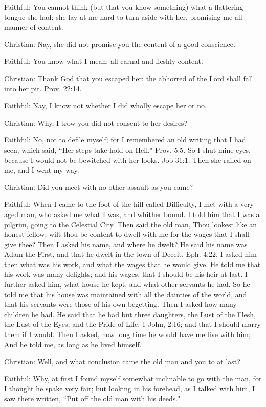 Faithful: You cannot think (but that you know something) what a flattering tongue she had; she lay at me hard to turn aside with her, promising me all manner of content.

Christian: Nay, she did not promise you the content of a good conscience.

Faithful: You know what I mean; all carnal and fleshly content.

Christian: Thank God that you escaped her: the abhorred of the Lord shall fall into her pit. Prov. 22:14.

Faithful: Nay, I know not whether I did wholly escape her or no.

Christian: Why, I trow you did not consent to her desires?

Faithful: No, not to defile myself; for I remembered an old writing that I had seen, which said, ``Her steps take hold on Hell." Prov. 5:5. So I shut mine eyes, because I would not be bewitched with her looks. Job 31:1. Then she railed on me, and I went my way.

Christian: Did you meet with no other assault as you came?

Faithful: When I came to the foot of the hill called Difficulty, I met with a very aged man, who asked me what I was, and whither bound. I told him that I was a pilgrim, going to the Celestial City. Then said the old man, Thou lookest like an honest fellow; wilt thou be content to dwell with me for the wages that I shall give thee? Then I asked his name, and where he dwelt? He said his name was Adam the First, and that he dwelt in the town of Deceit. Eph. 4:22. I asked him then what was his work, and what the wages that he would give. He told me that his work was many delights; and his wages, that I should be his heir at last. I further asked him, what house he kept, and what other servants he had. So he told me that his house was maintained with all the dainties of the world, and that his servants were those of his own begetting. Then I asked how many children he had. He said that he had but three daughters, the Lust of the Flesh, the Lust of the Eyes, and the Pride of Life, 1 John, 2:16; and that I should marry them if I would. Then I asked, how long time he would have me live with him; And he told me, as long as he lived himself.

Christian: Well, and what conclusion came the old man and you to at last?

Faithful: Why, at first I found myself somewhat inclinable to go with the man, for I thought he spake very fair; but looking in his forehead, as I talked with him, I saw there written, ``Put off the old man with his deeds."

